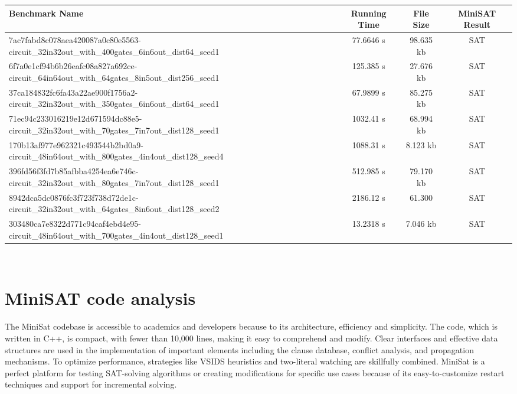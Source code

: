 \documentclass[runningheads]{llncs}
\begin{document}
\begin{adjustbox}{width=\textwidth,center}
\begin{tabular}{|p{16cm}|c|c|c|}
\hline
\textbf{Benchmark Name} & \textbf{Running Time} & \textbf{File Size} & \textbf{MiniSAT Result} \\ \hline
7ac7fabd8c078aea420087a0c80e5563-circuit\_32in32out\_with\_400gates\_6in6out\_dist64\_seed1 & 77.6646 s & 98.635 kb & SAT \\ \hline
6f7a0e1cf94b6b26eafc08a827a692ce-circuit\_64in64out\_with\_64gates\_8in5out\_dist256\_seed1 & 125.385 s & 27.676 kb & SAT \\ \hline
37ca184832fc6fa43a22ae900f1756a2-circuit\_32in32out\_with\_350gates\_6in6out\_dist64\_seed1 & 67.9899 s & 85.275 kb & SAT \\ \hline
71ec94c233016219e12d671594dc88e5-circuit\_32in32out\_with\_70gates\_7in7out\_dist128\_seed1 & 1032.41 s & 68.994 kb & SAT \\ \hline
170b13af977e962321c493544b2bd0a9-circuit\_48in64out\_with\_800gates\_4in4out\_dist128\_seed4 & 1088.31 s & 8.123 kb & SAT \\ \hline
396fd56f3fd7b85afbba4254ea6e746c-circuit\_32in32out\_with\_80gates\_7in7out\_dist128\_seed1 & 512.985 s & 79.170 kb & SAT \\ \hline
8942dca5dc0876fc3f723f738d72de1c-circuit\_32in32out\_with\_64gates\_8in6out\_dist128\_seed2 & 2186.12 s & 61.300 & SAT \\ \hline
303480ca7e8322d771c94caf4ebd4e95-circuit\_48in64out\_with\_700gates\_4in4out\_dist128\_seed1 & 13.2318 s & 7.046 kb & SAT \\ \hline
\end{tabular}
\end{adjustbox}
\\

\section{MiniSAT code analysis}
The MiniSat codebase is accessible to academics and developers because to its architecture, efficiency and simplicity. The code, which is written in C++, is compact, with fewer than 10,000 lines, making it easy to comprehend and modify. Clear interfaces and effective data structures are used in the implementation of important elements including the clause database, conflict analysis, and propagation mechanisms. To optimize performance, strategies like VSIDS heuristics and two-literal watching are skillfully combined. MiniSat is a perfect platform for testing SAT-solving algorithms or creating modifications for specific use cases because of its easy-to-customize restart techniques and support for incremental solving.\\
\end{document}
